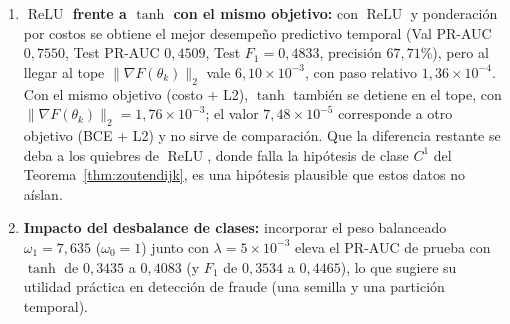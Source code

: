 \documentclass[a4paper,openany,oneside,10pt]{report}
\theoremstyle{pnlTeorema}
\theoremstyle{pnlDefinicion}
\theoremstyle{pnlObservacion}
\begin{document}
\begin{enumerate}
es $0{,}0915$--$0{,}1145$, lo que no constituye una cota uniforme, y, frente a $\lambda=0$ (PR-AUC $0{,}2467$), la generalización en
prueba mejora a $0{,}3435$ con los mismos pesos $\omega_1=\omega_0=1$; el rango $0{,}3435$--$0{,}4509$ de las demás corridas mezcla además el cambio de ponderación.
\item \textbf{$\operatorname{ReLU}$ frente a $\tanh$ con el mismo objetivo:} con
$\operatorname{ReLU}$ y ponderación por costos se obtiene el mejor desempeño
predictivo temporal (Val PR-AUC $0{,}7550$, Test PR-AUC $0{,}4509$, Test $F_1=0{,}4833$,
precisión $67{,}71$\%), pero al llegar al tope $\|\nabla F(\theta_k)\|_2$ vale
$6{,}10\times 10^{-3}$, con paso relativo $1{,}36\times 10^{-4}$. Con el mismo objetivo
(costo + L2), $\tanh$ también se detiene en el tope, con $\|\nabla F(\theta_k)\|_2=1{,}76\times 10^{-3}$;
el valor $7{,}48\times 10^{-5}$ corresponde a otro objetivo (BCE + L2) y no sirve
de comparación. Que la diferencia restante se deba a los quiebres de
$\operatorname{ReLU}$, donde falla la hipótesis de clase $C^1$ del
Teorema~\ref{thm:zoutendijk}, es una hipótesis plausible que estos datos no aíslan.
\item \textbf{Impacto del desbalance de clases:} incorporar el peso balanceado
$\omega_1=7{,}635$ ($\omega_0=1$) junto con $\lambda=5\times 10^{-3}$ eleva el PR-AUC de prueba con
$\tanh$ de $0{,}3435$ a $0{,}4083$ (y $F_1$ de $0{,}3534$ a $0{,}4465$),
lo que sugiere su utilidad práctica en detección de fraude (una semilla y una partición temporal).
\end{enumerate}

\end{document}
